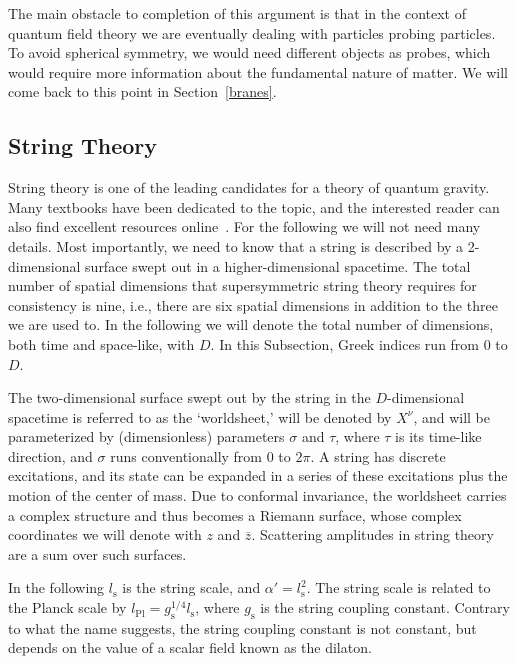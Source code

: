 \documentclass{article}
\begin{document}
The main obstacle to completion of this argument is that in the context of quantum field theory we
are eventually dealing with particles probing
particles. To avoid spherical symmetry, we would need different objects as probes, which would
require more information about the fundamental nature of matter. We will come back to this point in Section~\ref{branes}. 


\subsection{String Theory}
\label{string}

String theory is one of the leading candidates for a theory of quantum gravity. 
Many textbooks have been dedicated to the topic, and the interested reader can also find excellent resources online~\cite{Kiritsis:1997hj,Schwarz:2000ew,Mohaupt:2002py,Szabo:2002ca}. 
For the following we will not need many details. Most importantly, we need to know that a string is 
described by a 2-dimensional surface swept out in a higher-dimensional spacetime. The total
number of spatial dimensions that supersymmetric string theory requires for consistency is nine, i.e., there
are six spatial dimensions in addition to the three we are used to. In the following we will 
denote the total number of dimensions, both time and space-like, with $D$. In this Subsection,
Greek indices run from $0$ to $D$.

The two-dimensional surface swept out by the string in the $D$-dimensional spacetime
is referred to as the `worldsheet,' will be denoted by $X^\nu$, and will be parameterized by (dimensionless)
parameters $\sigma$ and
$\tau$, where $\tau$ is its time-like direction, and $\sigma$ runs conventionally from 0 to $2\pi$. A string has discrete excitations, and its
state can be expanded in a series of these excitations plus the motion of the center of mass. Due to conformal invariance, the worldsheet 
carries a complex structure and thus becomes a Riemann surface, whose complex coordinates we will denote with 
$z$ and $\overline z$. Scattering amplitudes in string theory are a sum over such surfaces.  


In the following $l_{\mathrm{s}}$ is the string scale, and $\alpha' = l_{\mathrm{s}}^2$.
The string scale is related to the Planck scale by $l_{\mathrm{Pl}} = g_{\mathrm{s}}^{1/4} l_{\mathrm{s}}$, where $g_{\mathrm{s}}$ is the string coupling
constant. Contrary to what the name suggests, the string coupling constant is not constant, but depends on
the value of a scalar field known as the dilaton. 
\end{document}
